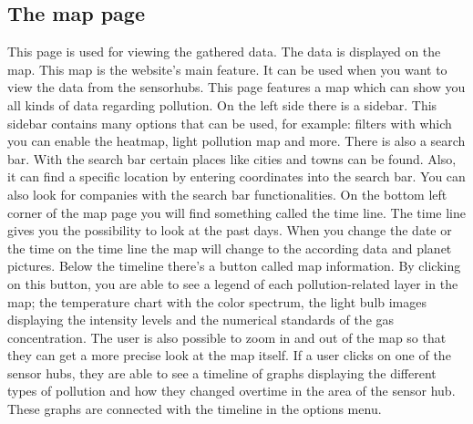 \documentclass[a4paper]{article}
\begin{document}
\subsection{The map page}
This page is used for viewing the gathered data. The data is displayed on the map. This map is the website's main feature. It can be used when you want to view the data from the sensorhubs.
\newline
This page features a map which can show you all kinds of data regarding pollution. On the left side there is a sidebar. This sidebar contains many options that can be used, for example: filters with which you can enable the heatmap, light pollution map and more.
\newline
\newline
There is also a search bar. With the search bar certain places like cities and towns can be found. Also, it can find a specific location by entering coordinates into the search bar. You can also look for companies with the search bar functionalities.
\newline
On the bottom left corner of the map page you will find something called the time line. The time line gives you the possibility to look at the past days. When you change the date or the time on the time line the map will change to the according data and planet pictures.  
\newline
Below the timeline there's a button called map information. By clicking on this button, you are able to see a legend of each pollution-related layer in the map; the temperature chart with the color spectrum, the light bulb images displaying the intensity levels and the numerical standards of the gas concentration.
\newline
\newline
The user is also possible to zoom in and out of the map so that they can get a more precise look at the map itself. 
\newline
If a user clicks on one of the sensor hubs, they are able to see a timeline of graphs displaying the different types of pollution and how they changed overtime in the area of the sensor hub. These graphs are connected with the timeline in the options menu.
\newline
\end{document}
